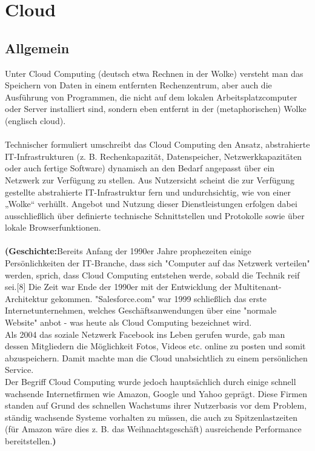 \chapter{Cloud}
\section{Allgemein}
Unter Cloud Computing (deutsch etwa Rechnen in der Wolke) versteht man das Speichern von Daten in einem entfernten Rechenzentrum, aber auch die Ausführung von Programmen, die nicht auf dem lokalen Arbeitsplatzcomputer oder Server installiert sind, sondern eben entfernt in der (metaphorischen) Wolke (englisch cloud).\\\\
Technischer formuliert umschreibt das Cloud Computing den Ansatz, abstrahierte IT-Infrastrukturen (z. B. Rechenkapazität, Datenspeicher, Netzwerkkapazitäten oder auch fertige Software) dynamisch an den Bedarf angepasst über ein Netzwerk zur Verfügung zu stellen. Aus Nutzersicht scheint die zur Verfügung gestellte abstrahierte IT-Infrastruktur fern und undurchsichtig, wie von einer „Wolke“ verhüllt. Angebot und Nutzung dieser Dienstleistungen erfolgen dabei ausschließlich über definierte technische Schnittstellen und Protokolle sowie über lokale Browserfunktionen.\\\\
\textbf{(Geschichte:}Bereits Anfang der 1990er Jahre prophezeiten einige Persönlichkeiten der IT-Branche, dass sich "Computer auf das Netzwerk verteilen" werden, sprich, dass Cloud Computing entstehen werde, sobald die Technik reif sei.[8] Die Zeit war Ende der 1990er mit der Entwicklung der Multitenant-Architektur gekommen. "Salesforce.com" war 1999 schließlich das erste Internetunternehmen, welches Geschäftsanwendungen über eine "normale Website" anbot - was heute als Cloud Computing bezeichnet wird.\\
Als 2004 das soziale Netzwerk Facebook ins Leben gerufen wurde, gab man dessen Mitgliedern die Möglichkeit Fotos, Videos etc. online zu posten und somit abzuspeichern. Damit machte man die Cloud unabsichtlich zu einem persönlichen Service.\\
Der Begriff Cloud Computing wurde jedoch hauptsächlich durch einige schnell wachsende Internetfirmen wie Amazon, Google und Yahoo geprägt. Diese Firmen standen auf Grund des schnellen Wachstums ihrer Nutzerbasis vor dem Problem, ständig wachsende Systeme vorhalten zu müssen, die auch zu Spitzenlastzeiten (für Amazon wäre dies z. B. das Weihnachtsgeschäft) ausreichende Performance bereitstellen.\textbf)

